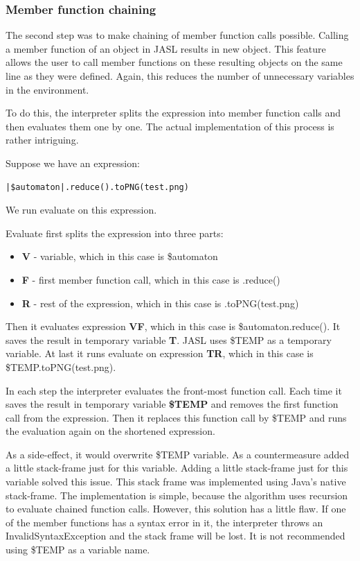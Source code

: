 \documentclass{ctuthesis}
\begin{document}
\subsubsection{Member function chaining}
\label{chaining_impl}
The second step was to make chaining of member function calls possible. Calling a member function of an object in JASL results in new object. This feature allows the user to call member functions on these resulting objects on the same line as they were defined. Again, this reduces the number of unnecessary variables in the environment.

To do this, the interpreter splits the expression into member function calls and then evaluates them one by one. The actual implementation of this process is rather intriguing. 

Suppose we have an expression:
\begin{lstlisting}[language = JASL_snippet]
	|$automaton|.reduce().toPNG(test.png)
\end{lstlisting}
We run evaluate on this expression.

Evaluate first splits the expression into three parts:
\begin{itemize}
	\item \textbf{V} - variable, which in this case is \$automaton
	\item \textbf{F} - first member function call, which in this case is .reduce()
	\item \textbf{R} - rest of the expression, which in this case is .toPNG(test.png)
\end{itemize}

Then it evaluates expression \textbf{VF}, which in this case is \$automaton.reduce(). It saves the result in temporary variable \textbf{T}. 	
JASL uses \$TEMP as a temporary variable. At last it runs evaluate on expression \textbf{TR}, which in this case is \$TEMP.toPNG(test.png).

In each step the interpreter evaluates the front-most function call. Each time it saves the result in temporary variable \textbf{\$TEMP} and removes the first function call from the expression. Then it replaces this function call by \$TEMP and runs the evaluation again on the shortened expression. 

As a side-effect, it would overwrite \$TEMP variable. As a countermeasure added a little stack-frame just for this variable. Adding a little stack-frame just for this variable solved this issue. This stack frame was implemented using Java's native stack-frame. The implementation is simple, because the algorithm uses recursion to evaluate chained function calls. However, this solution has a little flaw. If one of the member functions has a syntax error in it, the interpreter throws an InvalidSyntaxException and the stack frame will be lost. It is not recommended using \$TEMP as a variable name. 
\end{document}

